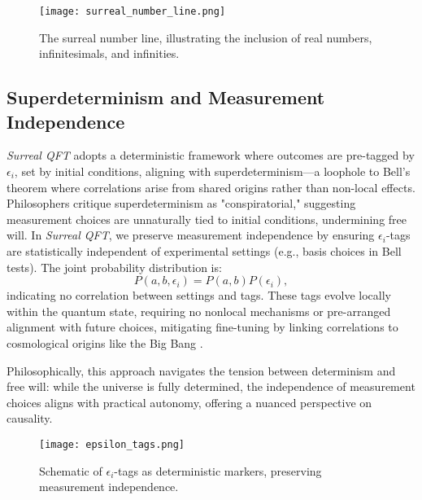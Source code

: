 \documentclass{article}
\begin{document}
\begin{figure}[h]
    \centering
    \texttt{[image: surreal\_number\_line.png]}
    \caption{The surreal number line, illustrating the inclusion of real numbers, infinitesimals, and infinities.}
    \label{fig:surreal_line}
\end{figure}

\subsection{Superdeterminism and Measurement Independence}
\textit{Surreal QFT} adopts a deterministic framework where outcomes are pre-tagged by \(\epsilon_i\), set by initial conditions, aligning with superdeterminism—a loophole to Bell's theorem where correlations arise from shared origins rather than non-local effects. Philosophers critique superdeterminism as "conspiratorial," suggesting measurement choices are unnaturally tied to initial conditions, undermining free will. In \textit{Surreal QFT}, we preserve measurement independence by ensuring \(\epsilon_i\)-tags are statistically independent of experimental settings (e.g., basis choices in Bell tests). The joint probability distribution is:
\begin{equation}
P(a, b, \epsilon_i) = P(a, b) P(\epsilon_i),
\end{equation}
indicating no correlation between settings and tags. These tags evolve locally within the quantum state, requiring no nonlocal mechanisms or pre-arranged alignment with future choices, mitigating fine-tuning by linking correlations to cosmological origins like the Big Bang \cite{SimonsObs2024}.

Philosophically, this approach navigates the tension between determinism and free will: while the universe is fully determined, the independence of measurement choices aligns with practical autonomy, offering a nuanced perspective on causality.

\begin{figure}[h]
    \centering
    \texttt{[image: epsilon\_tags.png]}
    \caption{Schematic of \(\epsilon_i\)-tags as deterministic markers, preserving measurement independence.}
    \label{fig:epsilon_tags}
\end{figure}
\end{document}
